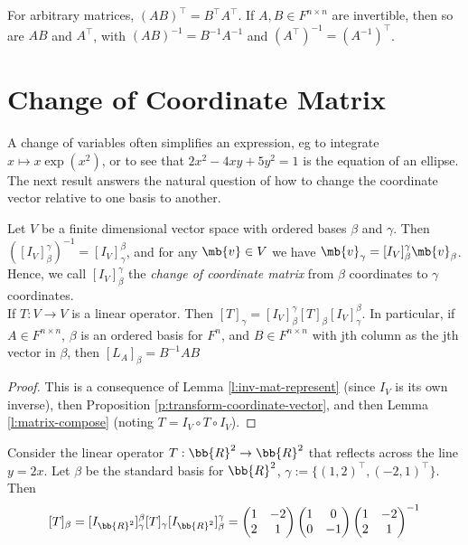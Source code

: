 \begin{exer}\label{e:transpose-inv}
For arbitrary matrices, $(AB)^\top= B^\top A^\top$. If $A,B \in F^{n \times n}$ are invertible, then so are $AB$ and $A^\top$, with $(AB)^{-1}=B^{-1}A^{-1}$ and $(A^\top)^{-1}=(A^{-1})^\top$.
\end{exer}

\section{Change of Coordinate Matrix}
A change of variables often simplifies an expression, eg to integrate $x \mapsto x \exp (x^2)$, or to see that $2x^2-4xy+5y^2=1$ is the equation of an ellipse. The next result answers the natural question of how to change the coordinate vector relative to one basis to another.
\begin{lem}\label{l:change-coord}
Let $V$ be a finite dimensional vector space with ordered bases $\beta$ and $\gamma$. Then $([I_V]_\beta^\gamma)^{-1}=[I_V]_\gamma^\beta$, and for any $\mb{v}\in V$ we have $\mb{v}_\gamma=[I_V]_\beta^\gamma \mb{v}_\beta$. Hence, we call $[I_V]_\beta^\gamma$ the \emph{change of coordinate matrix} from $\beta$ coordinates to $\gamma$ coordinates.\\
If $T:V \to V$ is a linear operator. Then $[T]_\gamma=[I_V]_\beta^\gamma [T]_\beta [I_V]_\gamma^\beta$. In particular, if $A \in F^{n \times n}$, $\beta$ is an ordered basis for $F^n$, and $B \in F^{n \times n}$ with jth column as the jth vector in $\beta$, then $[L_A]_\beta=B^{-1}AB$
\end{lem}
\begin{proof}%
This is a consequence of Lemma \ref{l:inv-mat-represent} (since $I_V$ is its own inverse), then Proposition \ref{p:transform-coordinate-vector}, and then Lemma \ref{l:matrix-compose} (noting $T=I_V \circ T \circ I_V$).
\end{proof}
\begin{example}\label{e:reflect}
Consider the linear operator $T: \bb{R}^2 \to \bb{R}^2$ that reflects across the line $y=2x$. Let $\beta$ be the standard basis for $\bb{R}^2$, $\gamma:= \{ (1,2)^\top,(-2,1)^\top \}$. Then
\[ [T]_\beta = [I_{\bb{R}^2}]_\gamma^\beta [T]_\gamma [I_{\bb{R}^2}]_\beta^\gamma = 
\begin{pmatrix} 1 & -2 \\ 2 & 1 \end{pmatrix}
\begin{pmatrix} 1 & 0 \\ 0 & -1 \end{pmatrix}
\begin{pmatrix} 1 & -2 \\ 2 & 1 \end{pmatrix}^{-1}\]
\end{example}
